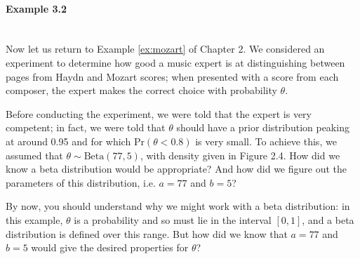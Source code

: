 \newpage

\paragraph{Example 3.2}{~\\
Now let us return to Example \ref{ex:mozart} of Chapter 2.  We considered an experiment to determine how good a music expert is at distinguishing between pages from Haydn and Mozart scores; when presented with a score from each composer, the expert makes the correct choice with probability $\theta$.  

Before conducting the experiment, we were told that the expert is very competent; in fact, we were told that $\theta$ should have a prior distribution peaking at around 0.95 and for which $\text{Pr}(\theta<0.8)$ is very small.  To achieve this, we assumed that $\theta \sim \text{Beta}(77,5)$, with density given in Figure 2.4.  How did we know a beta distribution would be appropriate?  And how did we figure out the parameters of this distribution, i.e. $a=77$ and $b=5$?  

By now, you should understand why we might work with a beta distribution: in this example, $\theta$ is a probability and so must lie in the interval $[0,1]$, and a beta distribution is defined over this range.  But how did we know that $a=77$ and $b=5$ would give the desired properties for $\theta$?  

}
